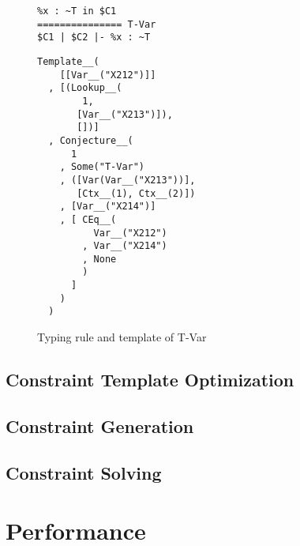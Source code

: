 \begin{figure}
  \centering
  \begin{minipage}{.45\linewidth}
\begin{verbatim}
%x : ~T in $C1
=============== T-Var
$C1 | $C2 |- %x : ~T
\end{verbatim}
  \end{minipage}
  \begin{minipage}{.45\linewidth}
\begin{verbatim}
Template__(
    [[Var__("X212")]]
  , [(Lookup__(
        1,
       [Var__("X213")]),
       [])]
  , Conjecture__(
      1
    , Some("T-Var")
    , ([Var(Var__("X213"))],
       [Ctx__(1), Ctx__(2)])
    , [Var__("X214")]
    , [ CEq__(
          Var__("X212")
        , Var__("X214")
        , None
        )
      ]
    )
  )
\end{verbatim}
  \end{minipage}
  \caption{Typing rule and template of T-Var}
  \label{fig:template-example}
\end{figure}
\subsection{Constraint Template Optimization}
\label{sec:constr-templ-optim}
\subsection{Constraint Generation}
\label{sec:constr-gener}
\subsection{Constraint Solving}
\label{sec:constraint-solving}
\section{Performance}
\label{sec:performance}

